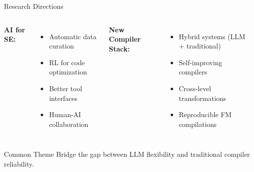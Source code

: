 \documentclass[aspectratio=169,10pt]{beamer}
\begin{document}
\begin{frame}{Research Directions}
    \begin{columns}[T]
    \textbf{AI for SE:}
    \begin{itemize}
        \item Automatic data curation
        \item RL for code optimization
        \item Better tool interfaces
        \item Human-AI collaboration
    \end{itemize}
    
    \textbf{New Compiler Stack:}
    \begin{itemize}
        \item Hybrid systems (LLM + traditional)
        \item Self-improving compilers
        \item Cross-level transformations
        \item Reproducible FM compilations
    \end{itemize}
    \end{columns}
    
    \vspace{1em}
    \begin{block}{Common Theme}
    Bridge the gap between LLM flexibility and traditional compiler reliability.
    \end{block}
\end{frame}
\end{document}
